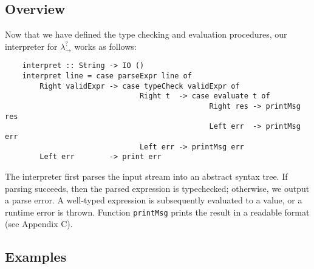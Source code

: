 \subsection{Overview}
Now that we have defined the type checking and evaluation procedures, 
our interpreter for $\lambda ^? _{\rightarrow}$ works as follows:
\begin{lstlisting}
    interpret :: String -> IO ()
    interpret line = case parseExpr line of 
        Right validExpr -> case typeCheck validExpr of 
                               Right t  -> case evaluate t of 
                                               Right res -> printMsg res
                                               Left err  -> printMsg err
                               Left err -> printMsg err
        Left err        -> print err   
\end{lstlisting}
The interpreter first parses the input stream into an abstract syntax tree. 
If parsing succeeds, then the parsed expression is typechecked; 
otherwise, we output a parse error. A well-typed expression is subsequently 
evaluated to a value, or a runtime error is thrown. Function \lstinline{printMsg} 
prints the result in a readable format (see Appendix C).

\subsection{Examples}




